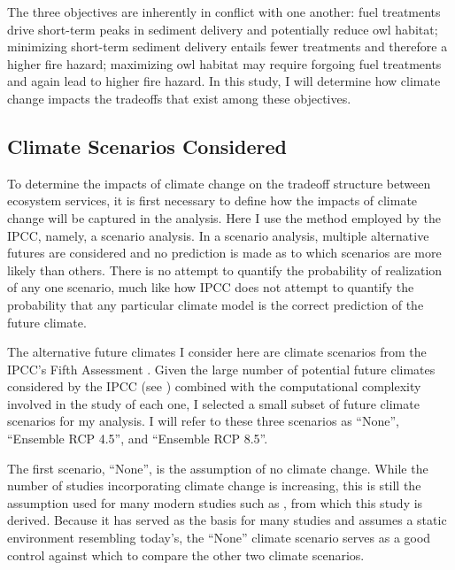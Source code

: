The three objectives are inherently in conflict with one another: fuel treatments drive short-term peaks in sediment delivery and potentially reduce owl habitat; minimizing short-term sediment delivery entails fewer treatments and therefore a higher fire hazard; maximizing owl habitat may require forgoing fuel treatments and again lead to higher fire hazard. In this study, I will determine how climate change impacts the tradeoffs that exist among these objectives.

\subsection{Climate Scenarios Considered}
To determine the impacts of climate change on the tradeoff structure between ecosystem services, it is first necessary to define how the impacts of climate change will be captured in the analysis. Here I use the method employed by the IPCC, namely, a scenario analysis. In a scenario analysis, multiple alternative futures are considered and no prediction is made as to which scenarios are more likely than others. There is no attempt to quantify the probability of realization of any one scenario, much like how IPCC does not attempt to quantify the probability that any particular climate model is the correct prediction of the future climate.

The alternative future climates I consider here are climate scenarios from the IPCC's Fifth Assessment \cite{ipcc2013climate}. Given the large number of potential future climates considered by the IPCC (see \cite{ipccListOfAR5Models}) combined with the computational complexity involved in the study of each one, I selected a small subset of  future climate scenarios for my analysis. I will refer to these three scenarios as ``None'', ``Ensemble RCP 4.5'', and ``Ensemble RCP 8.5''.

The first scenario, ``None'', is the assumption of no climate change. While the number of studies incorporating climate change is increasing, this is still the assumption used for many modern studies such as \cite{svetlanaDissertation2013}, from which this study is derived. Because it has served as the basis for many studies and assumes a static environment resembling today's, the ``None'' climate scenario serves as a good control against which to compare the other two climate scenarios.

